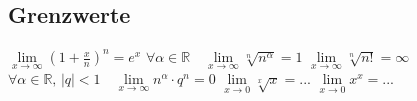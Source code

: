 \documentclass[landscape, 10pt]{article}
\newcommand{\R}{\mathbb{R}}
\begin{document}
\begin{multicols}{3}
\subsection{Grenzwerte}
$\lim\limits_{x\to\infty}(1+\frac{x}{n})^n=e^x$
$\forall\alpha\in\R\quad\lim\limits_{x\to\infty}\sqrt[n]{n^\alpha}=1$
$\lim\limits_{x\to\infty}\sqrt[n]{n!}=\infty$
$\forall\alpha\in\R,\,|q|<1\quad\lim\limits_{x\to\infty}n^\alpha\cdot q^n=0$
$\lim\limits_{x\to0}\sqrt[x]x=...$
$\lim\limits_{x\to0}x^x=...$
\end{multicols}
\end{document}
